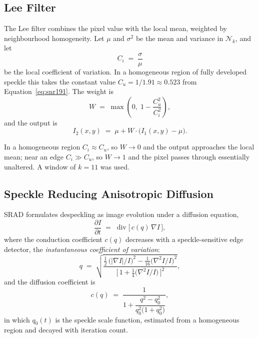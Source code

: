 \documentclass[12pt,a4paper,oneside]{report}
\begin{document}
\subsection{Lee Filter}

The Lee filter \cite{lee1980digital} combines the pixel value with the local mean,
weighted by neighbourhood homogeneity. Let $\mu$ and $\sigma^2$ be the mean and
variance in $\mathcal{N}_k$, and let
\begin{equation}
C_i \;=\; \frac{\sigma}{\mu}
\label{eq:ci}
\end{equation}
be the local coefficient of variation. In a homogeneous region of fully developed
speckle this takes the constant value $C_u = 1/1.91 \approx 0.523$ from
Equation~\eqref{eq:snr191}. The weight is
\begin{equation}
W \;=\; \max\!\left(0,\; 1-\frac{C_u^{2}}{C_i^{2}}\right),
\label{eq:leew}
\end{equation}
and the output is
\begin{equation}
I_2(x,y) \;=\; \mu + W\cdot\bigl(I_1(x,y)-\mu\bigr).
\label{eq:lee}
\end{equation}

In a homogeneous region $C_i \approx C_u$, so $W \to 0$ and the output approaches
the local mean; near an edge $C_i \gg C_u$, so $W \to 1$ and the pixel passes
through essentially unaltered. A window of $k=11$ was used.

\subsection{Speckle Reducing Anisotropic Diffusion}

SRAD \cite{yu2002srad} formulates despeckling as image evolution under a diffusion
equation,
\begin{equation}
\frac{\partial I}{\partial t}
   \;=\; \operatorname{div}\bigl[\,c(q)\,\nabla I\,\bigr],
\label{eq:sradpde}
\end{equation}
where the conduction coefficient $c(q)$ decreases with a speckle-sensitive edge
detector, the \emph{instantaneous coefficient of variation}:
\begin{equation}
q \;=\;
\sqrt{
  \frac{\tfrac{1}{2}\,\bigl(|\nabla I|/I\bigr)^{2}
        -\tfrac{1}{16}\bigl(\nabla^{2} I / I\bigr)^{2}}
       {\bigl[\,1+\tfrac{1}{4}\bigl(\nabla^{2} I / I\bigr)\,\bigr]^{2}}
} ,
\label{eq:icov}
\end{equation}
and the diffusion coefficient is
\begin{equation}
c(q) \;=\;
\frac{1}{1 + \dfrac{q^{2}-q_0^{2}}{q_0^{2}\bigl(1+q_0^{2}\bigr)}} ,
\label{eq:cq}
\end{equation}
in which $q_0(t)$ is the speckle scale function, estimated from a homogeneous
region and decayed with iteration count.
\end{document}
